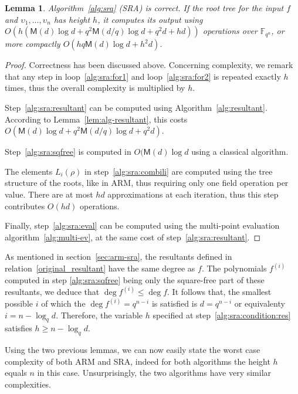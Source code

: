 \documentclass{sig-alternate}
\newcommand{\ff}[1]{\mathbb{F}_{#1}}
\newcommand{\dd}{d}
\newcommand{\qq}{q}
\newcommand{\nn}{n}
\newcommand{\qn}{{\qq^\nn}}
\newcommand{\extf}{\ff{\qn}}
\newcommand{\Mul}{\mathsf{M}}
\newcounter{algo}
\newtheorem{Lem}{Lemma}
\begin{document}
 \begin{Lem}
 \label{complexity_sra}
   Algorithm~\ref{alg:sra} (SRA) is correct. If the root tree for the
   input $f$ and $\upsilon_1,\dots,\upsilon_\nn$ has height $h$, it computes its
   output using $O\left(h(\Mul(\dd)\log \dd +
     \qq^2\Mul(\dd/\qq)\log\dd + \qq^2\dd + h\dd)\right)$ operations
   over $\extf$, or more compactly $O(h\qq\Mul(\dd)\log\dd + h^2\dd)$.
 \end{Lem}
 \begin{proof}
   Correctness has been discussed above. Concerning complexity, we
   remark that any step in loop~\ref{alg:sra:for1} and
   loop~\ref{alg:sra:for2} is repeated exactly $h$ times, thus the
   overall complexity is multiplied by $h$.

   Step~\ref{alg:sra:resultant} can be computed using
   Algorithm~\ref{alg:resultant}. According to
   Lemma~\ref{lem:alg-resultant}, this costs $O(\Mul(\dd) \log\dd +
   \qq^2\Mul(\dd/\qq)\log\dd + \qq^2\dd)$.

   Step~\ref{alg:sra:sqfree} is computed in $O(\Mul(\dd)\log\dd$ using
   a classical algorithm.

   The elements $L_i(\rho)$ in step~\ref{alg:sra:combili} are computed
   using the tree structure of the roots, like in ARM, thus requiring
   only one field operation per value. There are at most $hd$
   approximations at each iteration, thus this step contributes
   $O(hd)$ operations.
   
   Finally, step~\ref{alg:sra:eval} can be computed using the
   multi-point evaluation algorithm~\ref{alg:multi-ev}, at the same
   cost of step~\ref{alg:sra:resultant}.
 \end{proof}
   
As mentioned in section~\ref{sec:arm-sra}, the resultants defined in relation~\eqref{original_resultant} have the same degree as $f$. 
The polynomials $f^{(i)}$ computed in step \ref{alg:sra:sqfree} being only the 
square-free part of these resultants, we deduce that $\deg f^{(i)} \le  \deg f$. It follows that, 
the smallest possible $i$ of which the $\deg f^{(i)}=\qq^{n-i}$ is satisfied is $\dd=\qq^{n-i}$ or equivalenty
  $i=\nn -\log_\qq \dd$. Therefore, the variable $h$ specified at step~\ref{alg:sra:condition:res} satisfies $h \ge \nn -\log_\qq \dd$. 
 
 \medskip 
  
  
 Using the two previous lemmas, we can now easily state the worst case
 complexity of both ARM and SRA, indeed for both algorithms the height
 $h$ equals $\nn$ in this case. Unsurprisingly, the two algorithms
 have very similar complexities.
\end{document}
